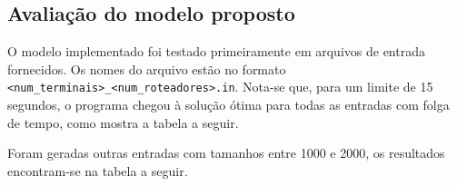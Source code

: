 \documentclass[7pt]{article}
\newcommand{\ttt}[1]{\texttt{#1}}
\begin{document}
\begin{multicols}{2}
\section{Avaliação do modelo proposto}
O modelo implementado foi testado primeiramente em arquivos de entrada
fornecidos. Os nomes do arquivo estão no formato
\ttt{<num\_terminais>\_<num\_roteadores>.in}.
Nota-se que, para um limite de 15 segundos, o programa chegou à solução ótima
para todas as entradas com folga de tempo, como mostra a tabela a seguir.



Foram geradas outras entradas com tamanhos entre 1000 e 2000, os resultados
encontram-se na tabela a seguir.



\end{multicols}
\end{document}
